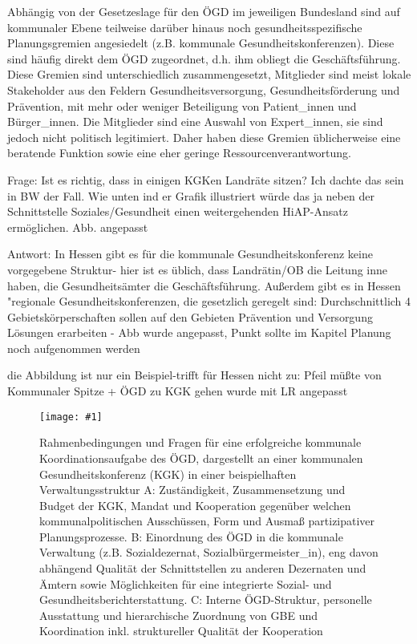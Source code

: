 \documentclass{article}
\newlength{\imgwidth}
\newcommand\scaledgraphics[2]{%
                
\settowidth{\imgwidth}{\texttt{[image: \#1]}}%
                
\setlength{\imgwidth}{\minof{\imgwidth}{#2\textwidth}}%
                
\texttt{[image: \#1]}%
                
}
\begin{document}
Abhängig von der Gesetzeslage für den ÖGD im jeweiligen Bundesland sind auf kommunaler Ebene teilweise darüber hinaus noch gesundheitsspezifische Planungsgremien angesiedelt (z.B. kommunale Gesundheitskonferenzen). Diese sind häufig direkt dem ÖGD zugeordnet, d.h. ihm obliegt die Geschäftsführung. Diese Gremien sind unterschiedlich zusammengesetzt, Mitglieder sind meist lokale Stakeholder aus den Feldern Gesundheitsversorgung, Gesundheitsförderung und Prävention, mit mehr oder weniger Beteiligung von Patient\_innen und Bürger\_innen. Die Mitglieder sind eine Auswahl von Expert\_innen, sie sind jedoch nicht politisch legitimiert. Daher haben diese Gremien üblicherweise eine beratende Funktion sowie eine eher geringe Ressourcenverantwortung.


Frage: Ist es richtig, dass in einigen KGKen Landräte sitzen?  Ich dachte das sein in BW der Fall. Wie unten ind er Grafik illustriert würde das ja neben der Schnittstelle Soziales/Gesundheit einen weitergehenden HiAP-Ansatz ermöglichen. Abb. angepasst


Antwort: In Hessen gibt es für die kommunale Gesundheitskonferenz keine vorgegebene Struktur- hier ist es  üblich, dass Landrätin/OB die Leitung inne haben, die Gesundheitsämter die Geschäftsführung. Außerdem gibt es in Hessen "regionale Gesundheitskonferenzen, die gesetzlich geregelt sind: Durchschnittlich 4  Gebietskörperschaften sollen auf den Gebieten Prävention und Versorgung Lösungen erarbeiten - Abb wurde angepasst, Punkt sollte im Kapitel Planung noch aufgenommen werden


die Abbildung ist nur ein Beispiel-trifft für Hessen nicht zu: Pfeil müßte von Kommunaler Spitze + ÖGD zu KGK gehen wurde mit LR angepasst

\begin{figure}
\scaledgraphics{dc0d4f16-5397-4981-a73c-357b6adf9a16.png}{1}
\caption*{Rahmenbedingungen und Fragen für eine erfolgreiche kommunale Koordinationsaufgabe des ÖGD, dargestellt an einer kommunalen Gesundheitskonferenz (KGK) in einer beispielhaften Verwaltungsstruktur A: Zuständigkeit, Zusammensetzung und Budget der KGK, Mandat und Kooperation gegenüber welchen kommunalpolitischen Ausschüssen, Form und Ausmaß partizipativer Planungsprozesse. B: Einordnung des ÖGD in die kommunale Verwaltung (z.B. Sozialdezernat, Sozialbürgermeister\_in), eng davon abhängend Qualität der Schnittstellen zu anderen Dezernaten und Ämtern sowie Möglichkeiten für eine integrierte Sozial- und Gesundheitsberichterstattung. C: Interne ÖGD-Struktur, personelle Ausstattung und hierarchische Zuordnung von GBE und Koordination inkl. struktureller Qualität der Kooperation}\label{F42572711}
\end{figure}
\end{document}
